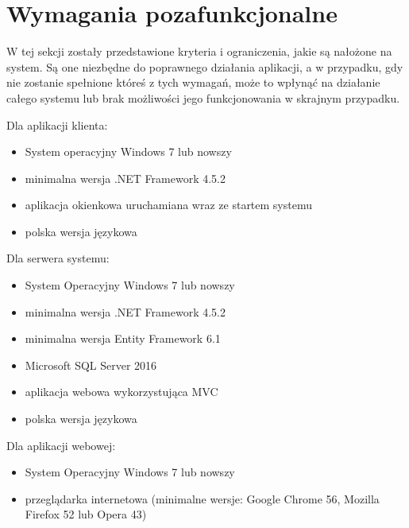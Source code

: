 \section{Wymagania pozafunkcjonalne}
W tej sekcji zostały przedstawione kryteria i ograniczenia, jakie są nałożone na system. Są one niezbędne do poprawnego działania aplikacji, a w przypadku, gdy nie zostanie spełnione któreś z tych wymagań, może to wpłynąć na działanie całego systemu lub brak możliwości jego funkcjonowania w skrajnym przypadku.

\vspace{1.0cm}

Dla aplikacji klienta:
\begin{itemize}
    \item System operacyjny Windows 7 lub nowszy
    \item minimalna wersja .NET Framework 4.5.2
    \item aplikacja okienkowa uruchamiana wraz ze startem systemu
    \item polska wersja językowa
\end{itemize}

\vspace{0.5cm}

Dla serwera systemu:
\begin{itemize}
    \item System Operacyjny Windows 7 lub nowszy
    \item minimalna wersja .NET Framework 4.5.2
    \item minimalna wersja Entity Framework 6.1
    \item Microsoft SQL Server 2016
    \item aplikacja webowa wykorzystująca MVC
    \item polska wersja językowa
\end{itemize}

\vspace{0.5cm}

Dla aplikacji webowej:
\begin{itemize}
    \item System Operacyjny Windows 7 lub nowszy
    \item przeglądarka internetowa (minimalne wersje: Google Chrome 56, Mozilla Firefox 52 lub Opera 43)
\end{itemize}